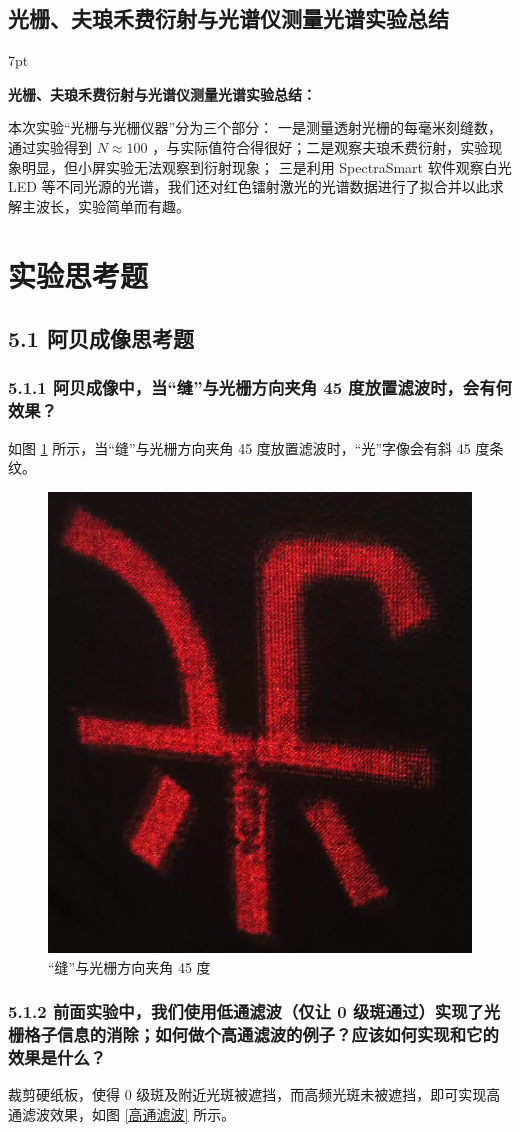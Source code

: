\documentclass[UTF8]{article}
\theoremstyle{MyLineTheoremStyle} %
\theoremstyle{MyBlockTheoremStyle} %
\theoremstyle{MySubsubsectionStyle} %
\newenvironment{graybox}{%
        \def\FrameCommand{%
        \hspace{1pt}%
        {\color{gray}\vrule width 2pt}%
        {\color{graybox_color}\vrule width 4pt}%
        \colorbox{graybox_color}%
        }%
        \MakeFramed{\advance\hsize-\width\FrameRestore}%
        \noindent\hspace{-4.55pt}%
        \begin{adjustwidth}{}{7pt}%
        \vspace{2pt}\vspace{2pt}%
        }
        {%
        \vspace{2pt}\end{adjustwidth}\endMakeFramed%
        }
\begin{document}
\subsection{光栅、夫琅禾费衍射与光谱仪测量光谱实验总结}

\begin{graybox}
\textbf{光栅、夫琅禾费衍射与光谱仪测量光谱实验总结：}

本次实验“光栅与光栅仪器”分为三个部分：
一是测量透射光栅的每毫米刻缝数，通过实验得到 $N\approx100$ ，与实际值符合得很好；二是观察夫琅禾费衍射，实验现象明显，但小屏实验无法观察到衍射现象；
三是利用 SpectraSmart 软件观察白光 LED 等不同光源的光谱，我们还对红色镭射激光的光谱数据进行了拟合并以此求解主波长，实验简单而有趣。
\end{graybox}



\section{实验思考题}

\subsection*{5.1 阿贝成像思考题}
\subsubsection*{5.1.1 阿贝成像中，当“缝”与光栅方向夹角 45 度放置滤波时，会有何效果？}
如图 \ref{45 度} 所示，当“缝”与光栅方向夹角 45 度放置滤波时，“光”字像会有斜 45 度条纹。
\begin{figure}[H]\centering
    \includegraphics[width=0.5\columnwidth]{assets/1 阿贝尔/光 45度.png}
    \caption{“缝”与光栅方向夹角 45 度}\label{45 度}
\end{figure}

\subsubsection*{5.1.2 前面实验中，我们使用低通滤波（仅让 0 级斑通过）实现了光栅格子信息的消除；如何做个高通滤波的例子？应该如何实现和它的效果是什么？}
裁剪硬纸板，使得 0 级斑及附近光斑被遮挡，而高频光斑未被遮挡，即可实现高通滤波效果，如图 \ref{高通滤波} 所示。
\end{document}
